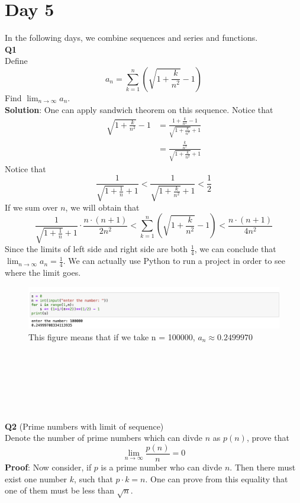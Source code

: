 \documentclass{article}
\newcommand{\tb}[1]{\textbf{#1}}
\begin{document}
\section{Day 5}
In the following days, we combine sequences and series and functions.\\
\tb{Q1}\\
Define
$$
a_n = \sum_{k=1}^{n} \left (\sqrt{1+\frac{k}{n^2}}-1\right )
$$
Find $\lim_{n \to \infty} a_n$.\\
\tb{Solution}: One can apply sandwich theorem on this sequence. Notice that
\begin{align*}
    \sqrt{1+\frac{k}{n^2}}-1 &= \frac{1+\frac{k}{n^2}-1}{\sqrt{1+\frac{k}{n^2}}+1}\\
    &= \frac{\frac{k}{n^2}}{\sqrt{1+\frac{k}{n^2}}+1}
\end{align*}
Notice that
$$
\frac{1}{\sqrt{1+\frac{1}{n}}+1}< \frac{1}{\sqrt{1+\frac{k}{n^2}}+1} < \frac{1}{2}
$$
If we sum over $n$, we will obtain that
$$
\frac{1}{\sqrt{1+\frac{1}{n}}+1} \cdot \frac{n \cdot (n+1)}{2n^2}<\sum_{k=1}^{n} \left (\sqrt{1+\frac{k}{n^2}}-1\right ) < \frac{n \cdot (n+1)}{4n^2}
$$
Since the limits of left side and right side are both $\frac{1}{4}$, we can conclude that $\lim_{n \to \infty} a_n = \frac{1}{4}$. We can actually use Python to run a project 
in order to see where the limit goes.
\begin{figure}[htbp]
    \centerline{\includegraphics[scale = 0.35]{sequence in python.png}}
    \caption{This figure means that if we take n = 100000, $a_n \approx 0.2499970$}
    \label{fig}
\end{figure}
\\
\\
\\
\\
\\
\\
\tb{Q2} (Prime numbers with limit of sequence)\\
Denote the number of prime numbers which can divde $n$ as $p(n)$, prove that
$$
\lim_{n \to \infty} \frac{p(n)}{n} = 0
$$
\tb{Proof}: Now consider, if $p$ is a prime number who can divde $n$. Then there must exist one number $k$, 
such that $p \cdot k = n$. One can prove from this equality that one of them must be less than $\sqrt{n}$.
\end{document}

